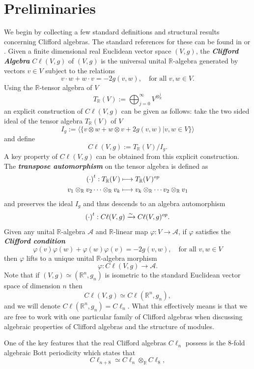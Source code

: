 \documentclass[openany, 11pt]{article}
\theoremstyle{definition}
\theoremstyle{remark}
\def\la{\ensuremath{\langle}}
\def\ra{\ensuremath{\rangle}}
\def\lp{\ensuremath{\left(}}
\def\rp{\ensuremath{\right)}}
\def\bR{\ensuremath{\mathbb{R}}}
\begin{document}
\section{Preliminaries}
We begin by collecting a few standard definitions and structural results concerning Clifford algebras. The standard references for these can be found in \cite{ABS} or \cite{LM}. Given a finite dimensional real Euclidean vector space $(V,g)$, the \textbf{\emph{Clifford Algebra}} $C\ell(V,g)$ of $(V,g)$ is the universal unital $\bR$-algebra generated by vectors $v\in V$ subject to the relations
\[
    v\cdot w+w\cdot v=-2g(v,w),\quad \text{for all } v,w\in V.
\]
Using the $\bR$-tensor algebra of $V$
\[
    T_{\bR}(V):=\bigoplus_{j=0}^{\infty}V^{\otimes^j_{\bR}}
\]
an explicit construction of $C\ell(V,g)$ can be given as follows: take the two sided ideal of the tensor algebra $T_{\bR}(V)$ of $V$
\[
    I_g:=\la \bigl\{v\otimes w+w\otimes v+2g(v,w)\big|v,w\in V\bigr\}\ra
\]
and define
\[
    C\ell(V,g):=T_{\bR}(V)/I_g.
\]
A key property of $C\ell(V,g)$ can be obtained from this explicit construction. The \textbf{\emph{transpose automorphism}} on the tensor algebra is defined as
\begin{align*}
    \lp\cdot\rp^t:T_{\bR}(V)&\longmapsto T_{\bR}(V)^{op}\\
    v_1\otimes_{\bR}v_2\cdots\otimes_{\bR}v_k&\longmapsto v_k\otimes_{\bR}\cdots v_2\otimes_{\bR}v_1
\end{align*}
and preserves the ideal $I_g$ and thus descends to an algebra automorphism
\[
    \lp\cdot\rp^t:C\ell(V,g)\xrightarrow{\sim}C\ell(V,g)^{op}.
\]
Given any unital $\bR$-algebra $\mathcal{A}$ and $\bR$-linear map $\varphi:V\rightarrow \mathcal{A}$, if $\varphi$ satisfies the \textbf{\emph{Clifford condition}}
\[
    \varphi(v)\varphi(w)+\varphi(w)\varphi(v)=-2g(v,w),\quad\text{for all }v,w\in V
\]
then $\varphi$ lifts to a unique unital $\bR$-algebra morphism
\[
    \varphi:C\ell(V,g)\rightarrow \mathcal{A}.
\]
Note that if $(V,g)\simeq(\bR^n,g_n)$ is isometric to the standard Euclidean vector space of dimension $n$ then
\[
    C\ell(V,g)\simeq C\ell(\bR^n,g_n),
\]
and we will denote $C\ell(\bR^n,g_n)=C\ell_n$. What this effectively means is that we are free to work with one particular family of Clifford algebras when discussing algebraic properties of Clifford algebras and the structure of modules.\par
One of the key features that the real Clifford algebras $C\ell_n$ possess is the $8$-fold algebraic Bott periodicity which states that
\[
    C\ell_{n+8}\simeq C\ell_n\otimes_{\bR} C\ell_8, 
\]
\end{document}
